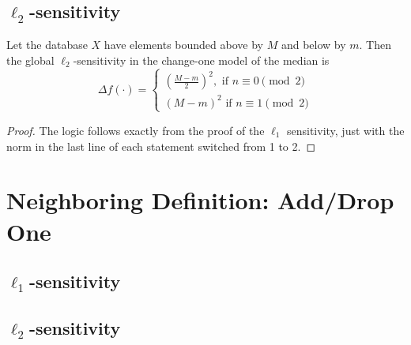 \documentclass[11pt]{scrartcl} %
\begin{document}
\subsection{$\ell_2$-sensitivity}
\begin{theorem}
	Let the database $X$ have elements bounded above by $M$ and below by $m$.
	Then the global $\ell_2$-sensitivity in the change-one model of the median is
	\[
		\Delta f(\cdot) =
			\begin{cases}
				\left( \frac{M - m}{2} \right)^2, \text{ if } n \equiv 0 \pmod{2} \\
				(M-m)^2 \text{ if } n \equiv 1 \pmod{2}
			\end{cases}
	\]
\end{theorem}

\begin{proof}
	The logic follows exactly from the proof of the $\ell_1$ sensitivity,
	just with the norm in the last line of each statement switched from 1 to 2.
\end{proof}

\section{Neighboring Definition: Add/Drop One}

\subsection{$\ell_1$-sensitivity}

\subsection{$\ell_2$-sensitivity}
\end{document}
